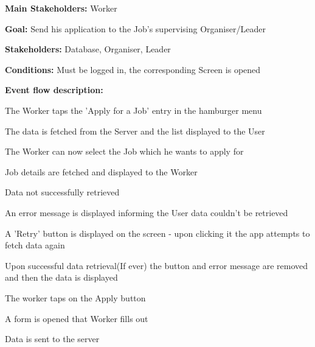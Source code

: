 				\noindent {}
				\begin{packed_item}
					\item \textbf{Main Stakeholders:} Worker
					\item \textbf{Goal:} Send his application to the Job's supervising Organiser/Leader
					\item \textbf{Stakeholders: } Database, Organiser, Leader
					\item \textbf{Conditions: } Must be logged in, the corresponding Screen is opened
					\item \textbf{Event flow description: }
					\begin{packed_enum}
						\item The Worker taps the 'Apply for a Job' entry in the hamburger menu
						\item The data is fetched from the Server and the list displayed to the User
						\item The Worker can now select the Job which he wants to apply for
						\item Job details are fetched and displayed to the Worker
					\end{packed_enum}
					
					\begin{packed_item}
						\item[1.a, 3.a] Data not successfully retrieved
						\item[] \begin{packed_enum}
							\item An error message is displayed informing the User data couldn't be retrieved
							\item A 'Retry' button is displayed on the screen - upon clicking it the app attempts to fetch data again
							\item Upon successful data retrieval(If ever) the button and error message are removed and then the data is displayed
						\end{packed_enum}
						
						\item[3.a] The worker taps on the Apply button
						\item[] \begin{packed_enum}
							\item A form is opened that Worker fills out
							\item Data is sent to the server
							\item[] \begin{packed_enum}
								

\end{packed_enum}
\end{packed_enum}
\end{packed_item}
\end{packed_item}
